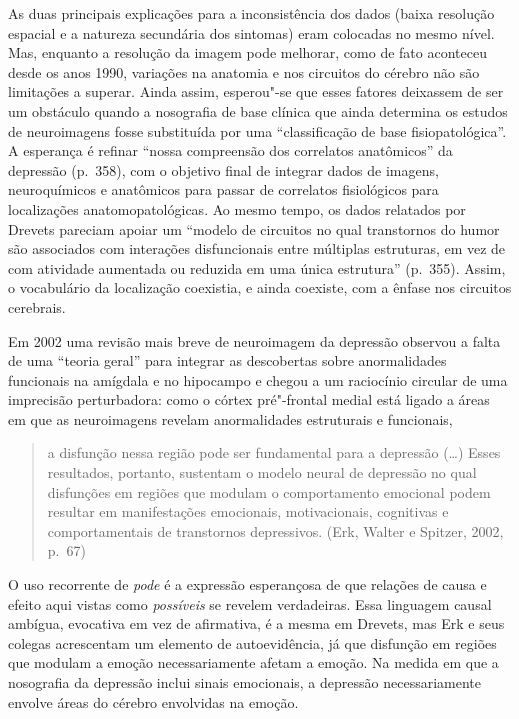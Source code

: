 As duas principais explicações para a inconsistência dos dados (baixa
resolução espacial e a natureza secundária dos sintomas) eram colocadas
no mesmo nível. Mas, enquanto a resolução da imagem pode melhorar, como
de fato aconteceu desde os anos 1990, variações na anatomia e nos
circuitos do cérebro não são limitações a superar. Ainda assim,
esperou"-se que esses fatores deixassem de ser um obstáculo quando a
nosografia de base clínica que ainda determina os estudos de
neuroimagens fosse substituída por uma ``classificação de base
fisiopatológica''. A esperança é refinar ``nossa compreensão dos
correlatos anatômicos'' da depressão (p.~358), com o objetivo final de
integrar dados de imagens, neuroquímicos e anatômicos para passar de
correlatos fisiológicos para localizações anatomopatológicas. Ao mesmo
tempo, os dados relatados por Drevets pareciam apoiar um ``modelo de
circuitos no qual transtornos do humor são associados com interações
disfuncionais entre múltiplas estruturas, em vez de com atividade
aumentada ou reduzida em uma única estrutura'' (p.~355). Assim, o
vocabulário da localização coexistia, e ainda coexiste, com a ênfase nos
circuitos cerebrais.

Em 2002 uma revisão mais breve de neuroimagem da depressão observou a
falta de uma ``teoria geral'' para integrar as descobertas sobre
anormalidades funcionais na amígdala e no hipocampo e chegou a um
raciocínio circular de uma imprecisão perturbadora: como o córtex
pré"-frontal medial está ligado a áreas em que as neuroimagens revelam
anormalidades estruturais e funcionais,

\begin{quote}
a disfunção nessa região pode ser fundamental para a depressão (\ldots{})
Esses resultados, portanto, sustentam o modelo neural de depressão no
qual disfunções em regiões que modulam o comportamento emocional podem
resultar em manifestações emocionais, motivacionais, cognitivas e
comportamentais de transtornos depressivos. (Erk, Walter e Spitzer,
2002, p.~67)
\end{quote}

O uso recorrente de \emph{pode} é a expressão esperançosa de que
relações de causa e efeito aqui vistas como \emph{possíveis} se revelem
verdadeiras. Essa linguagem causal ambígua, evocativa em vez de
afirmativa, é a mesma em Drevets, mas Erk e seus colegas acrescentam um
elemento de autoevidência, já que disfunção em regiões que modulam a
emoção necessariamente afetam a emoção. Na medida em que a nosografia da
depressão inclui sinais emocionais, a depressão necessariamente envolve
áreas do cérebro envolvidas na emoção.

